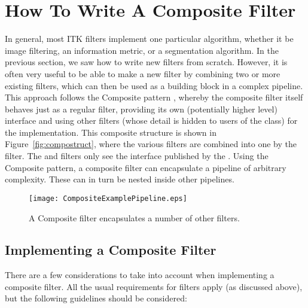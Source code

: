 
\section{How To Write A Composite Filter}

In general, most ITK filters implement one particular algorithm, whether it
be image filtering, an information metric, or a segmentation algorithm.  In
the previous section, we saw how to write new filters from scratch.
However, it is often very useful to be able to make a new filter by
combining two or more existing filters, which can then be used as a building
block in a complex pipeline.  This approach follows the Composite pattern
\cite{Gamma1995}, whereby the composite filter itself behaves just as a
regular filter, providing its own (potentially higher level) interface and
using other filters (whose detail is hidden to users of the class) for the
implementation.  This composite structure is shown in
Figure~\ref{fig:compostruct}, where the various  filters are
combined into one by the  filter.  The  and
 filters only see the interface published by the
.  Using the Composite pattern, a composite filter can
encapsulate a pipeline of arbitrary complexity.  These can in turn be nested
inside other pipelines.

\begin{figure}
  \centering
  \texttt{[image: CompositeExamplePipeline.eps]}
  \caption{A Composite filter encapsulates a number of other filters.} 
  \label{fig:compstruct}
\end{figure}

\subsection{Implementing a Composite Filter}

There are a few considerations to take into account when implementing a
composite filter.  All the usual requirements for filters apply (as
discussed above), but the following guidelines should be considered:

